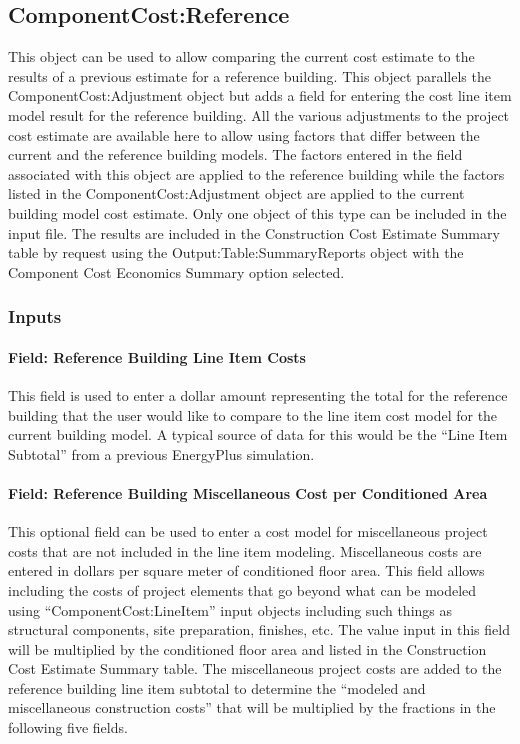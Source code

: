 \subsection{ComponentCost:Reference}\label{componentcostreference}

This object can be used to allow comparing the current cost estimate to the results of a previous estimate for a reference building. This object parallels the ComponentCost:Adjustment object but adds a field for entering the cost line item model result for the reference building. All the various adjustments to the project cost estimate are available here to allow using factors that differ between the current and the reference building models. The factors entered in the field associated with this object are applied to the reference building while the factors listed in the ComponentCost:Adjustment object are applied to the current building model cost estimate. Only one object of this type can be included in the input file. The results are included in the Construction Cost Estimate Summary table by request using the Output:Table:SummaryReports object with the Component Cost Economics Summary option selected.

\subsubsection{Inputs}\label{inputs-2}

\paragraph{Field: Reference Building Line Item Costs}\label{field-reference-building-line-item-costs}

This field is used to enter a dollar amount representing the total for the reference building that the user would like to compare to the line item cost model for the current building model. A typical source of data for this would be the ``Line Item Subtotal'' from a previous EnergyPlus simulation.

\paragraph{Field: Reference Building Miscellaneous Cost per Conditioned Area}\label{field-reference-building-miscellaneous-cost-per-conditioned-area}

This optional field can be used to enter a cost model for miscellaneous project costs that are not included in the line item modeling. Miscellaneous costs are entered in dollars per square meter of conditioned floor area. This field allows including the costs of project elements that go beyond what can be modeled using ``ComponentCost:LineItem'' input objects including such things as structural components, site preparation, finishes, etc. The value input in this field will be multiplied by the conditioned floor area and listed in the Construction Cost Estimate Summary table. The miscellaneous project costs are added to the reference building line item subtotal to determine the ``modeled and miscellaneous construction costs'' that will be multiplied by the fractions in the following five fields.

